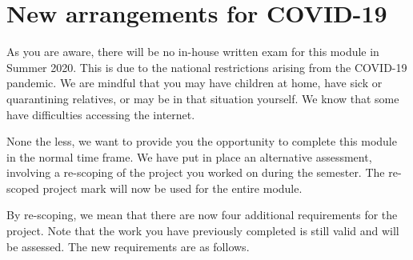 \documentclass[12pt, a4paper]{article}
\title{\projectname}
\author{\modulename}
\date{Due: \duedate}
\begin{document}
  
\section*{New arrangements for COVID-19}

As you are aware, there will be no in-house written exam for this module in Summer 2020.
This is due to the national restrictions arising from the COVID-19 pandemic.
We are mindful that you may have children at home, have sick or quarantining relatives, or may be in that situation yourself.
We know that some have difficulties accessing the internet.

None the less, we want to provide you the opportunity to complete this module in the normal time frame.
We have put in place an alternative assessment, involving a re-scoping of the project you worked on during the semester.
The re-scoped project mark will now be used for the entire module.

By re-scoping, we mean that there are now four additional requirements for the project.
Note that the work you have previously completed is still valid and will be assessed.
The new requirements are as follows.
\end{document}
